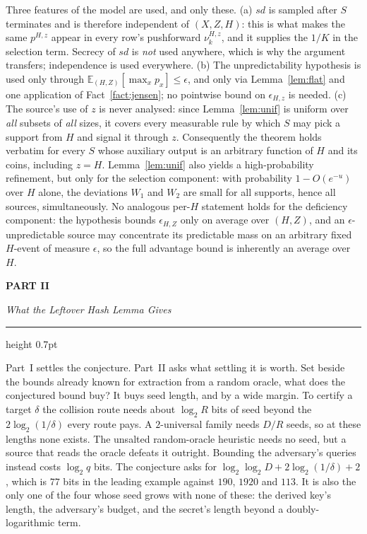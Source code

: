 \documentclass{aicr-solution}
\newcommand{\sd}{\mathit{sd}}
\newcommand{\cjpart}[2]{%
  \clearpage
  {\noindent\sffamily\bfseries\color{cjAccent}\footnotesize PART #1}\par
  \vspace{0.35em}%
  {\noindent\LARGE\itshape #2\par}
  \vspace{0.5em}%
  {\color{cjAccent}\hrule height 0.7pt}%
  \vspace{1.4em}%
}
\begin{document}
\begin{remark}
Three features of the model are used, and only these. (a) $\sd$ is sampled after $S$ terminates and
is therefore independent of $(X,Z,H)$: this is what makes the same $p^{H,z}$ appear in every row's
pushforward $\nu^{H,z}_{k}$, and it supplies the $1/K$ in the selection term. Secrecy of $\sd$ is
\emph{not} used anywhere, which is why the argument transfers; independence is used everywhere. (b)
The unpredictability hypothesis is used only through $\mathbb{E}_{(H,Z)}[\max_x p_x] \le \epsilon$,
and only via Lemma~\ref{lem:flat} and one application of Fact~\ref{fact:jensen}; no pointwise bound on
$\epsilon_{H,z}$ is needed. (c) The source's use of $z$ is never analysed: since
Lemma~\ref{lem:unif} is uniform over \emph{all} subsets of \emph{all} sizes, it covers every
measurable rule by which $S$ may pick a support from $H$ and signal it through $z$. Consequently the
theorem holds verbatim for every $S$ whose auxiliary output is an arbitrary function of $H$ and its
coins, including $z = H$. Lemma~\ref{lem:unif} also yields a high-probability refinement, but only
for the selection component: with probability $1 - O(e^{-u})$ over $H$ alone, the deviations
$W_{1}$ and $W_{2}$ are small for all supports, hence all sources, simultaneously. No analogous per-$H$ statement holds for
the deficiency component: the hypothesis bounds $\epsilon_{H,Z}$ only on average over $(H,Z)$, and
an $\epsilon$-unpredictable source may concentrate its predictable mass on an arbitrary fixed $H$-event of
measure $\epsilon$, so the full advantage bound is inherently an average over $H$.
\end{remark}
\cjpart{II}{What the Leftover Hash Lemma Gives}

Part~I settles the conjecture. Part~II asks what settling it is worth. Set beside the bounds already
known for extraction from a random oracle, what does the conjectured bound buy? It buys seed length,
and by a wide margin. To certify a target $\delta$ the collision route needs about $\log_2 R$ bits
of seed beyond the $2\log_2(1/\delta)$ every route pays. A $2$-universal family needs $D/R$ seeds,
so at these lengths none exists. The unsalted random-oracle heuristic needs no seed, but a source
that reads the oracle defeats it outright. Bounding the adversary's queries instead costs
$\log_2 q$ bits. The conjecture asks for $\log_2\log_2 D + 2\log_2(1/\delta) + 2$, which is $77$
bits in the leading example against $190$, $1920$ and $113$. It is also the only one of the four
whose seed grows with none of these: the derived key's length, the adversary's budget, and the
secret's length beyond a doubly-logarithmic term.
\end{document}
